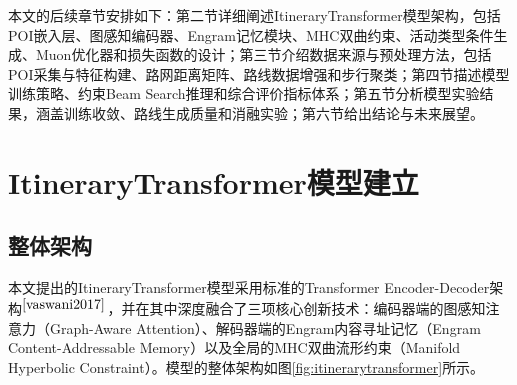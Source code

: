 \documentclass[12pt,a4paper]{ctexart}
\begin{document}
本文的后续章节安排如下：第二节详细阐述ItineraryTransformer模型架构，包括POI嵌入层、图感知编码器、Engram记忆模块、MHC双曲约束、活动类型条件生成、Muon优化器和损失函数的设计；第三节介绍数据来源与预处理方法，包括POI采集与特征构建、路网距离矩阵、路线数据增强和步行聚类；第四节描述模型训练策略、约束Beam Search推理和综合评价指标体系；第五节分析模型实验结果，涵盖训练收敛、路线生成质量和消融实验；第六节给出结论与未来展望。

\section{ItineraryTransformer模型建立}

\subsection{整体架构}

本文提出的ItineraryTransformer模型采用标准的Transformer Encoder-Decoder架构$^{\cite{vaswani2017}}$，并在其中深度融合了三项核心创新技术：编码器端的图感知注意力（Graph-Aware Attention）、解码器端的Engram内容寻址记忆（Engram Content-Addressable Memory）以及全局的MHC双曲流形约束（Manifold Hyperbolic Constraint）。模型的整体架构如图\ref{fig:itinerarytransformer}所示。
\end{document}
